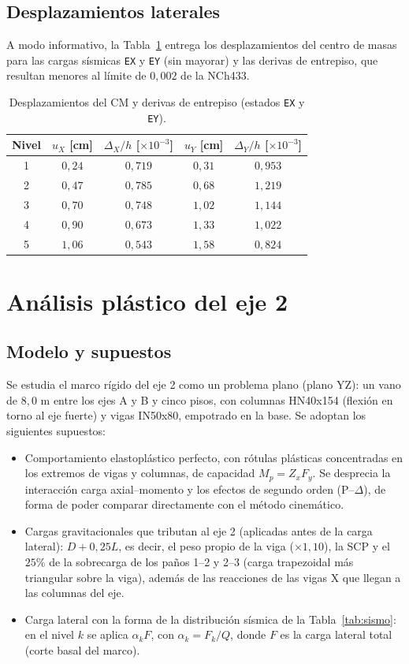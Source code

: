 \documentclass[11pt,letterpaper]{article}
\begin{document}
\subsection{Desplazamientos laterales}
A modo informativo, la Tabla~\ref{tab:desp} entrega los desplazamientos del centro de masas para las cargas
sísmicas \texttt{EX} y \texttt{EY} (sin mayorar) y las derivas de entrepiso, que resultan menores al límite
de $0{,}002$ de la NCh433.
\begin{table}[H]
\centering
\caption{Desplazamientos del CM y derivas de entrepiso (estados \texttt{EX} y \texttt{EY}).}
\label{tab:desp}
\begin{tabular}{ccccc}
\toprule
Nivel & $u_X$ [cm] & $\Delta_X/h$ [$\times 10^{-3}$] & $u_Y$ [cm] & $\Delta_Y/h$ [$\times 10^{-3}$] \\
\midrule
1 & $0{,}24$ & $0{,}719$ & $0{,}31$ & $0{,}953$ \\
2 & $0{,}47$ & $0{,}785$ & $0{,}68$ & $1{,}219$ \\
3 & $0{,}70$ & $0{,}748$ & $1{,}02$ & $1{,}144$ \\
4 & $0{,}90$ & $0{,}673$ & $1{,}33$ & $1{,}022$ \\
5 & $1{,}06$ & $0{,}543$ & $1{,}58$ & $0{,}824$ \\
\bottomrule
\end{tabular}
\end{table}

\section{Análisis plástico del eje 2}

\subsection{Modelo y supuestos}
Se estudia el marco rígido del eje 2 como un problema plano (plano YZ): un vano de $8{,}0$ m entre los ejes
A y B y cinco pisos, con columnas HN40x154 (flexión en torno al eje fuerte) y vigas IN50x80,
empotrado en la base. Se adoptan los siguientes supuestos:
\begin{itemize}
  \item Comportamiento elastoplástico perfecto, con rótulas plásticas concentradas en los extremos de vigas y
        columnas, de capacidad $M_p = Z_x F_y$. Se desprecia la interacción carga axial--momento y los efectos
        de segundo orden (P--$\Delta$), de forma de poder comparar directamente con el método cinemático.
  \item Cargas gravitacionales que tributan al eje 2 (aplicadas antes de la carga lateral):
        $D + 0{,}25L$, es decir, el peso propio de la viga ($\times 1{,}10$), la SCP y el $25\%$ de la
        sobrecarga de los paños 1--2 y 2--3 (carga trapezoidal más triangular sobre la viga), además de las reacciones de las
        vigas X que llegan a las columnas del eje.
  \item Carga lateral con la forma de la distribución sísmica de la Tabla~\ref{tab:sismo}: en el nivel $k$ se aplica
        $\alpha_k F$, con $\alpha_k = F_k/Q$, donde $F$ es la carga lateral total (corte basal del marco).
\end{itemize}
\end{document}
